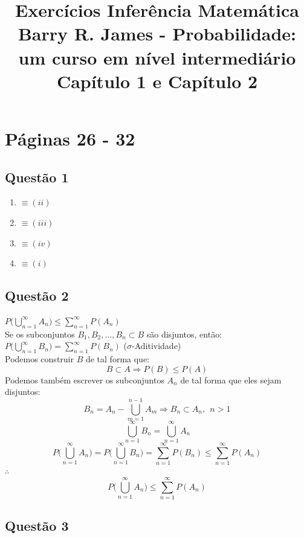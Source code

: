 \documentclass[a4paper,12pt]{report}
\author{}
\title{Exercícios Inferência Matemática\\
Barry R. James - Probabilidade: um curso em nível intermediário\\
Capítulo 1 e Capítulo 2
}
\date{}
\begin{document}
	\maketitle
	\tableofcontents	
	\newpage
	
	
	\chapter{Páginas 26 - 32}
	\section{Questão 1}
	\begin{enumerate}[label=(\alph*)]
		\item  $\equiv (ii)$
		\item $\equiv (iii)$
		\item $\equiv (iv)$
		\item $\equiv (i)$
	\end{enumerate}


       \section{Questão 2}


$P\bigg(\bigcup\limits_{n=1}^{\infty}A_n \bigg) \le \sum\limits_{n=1}^{\infty}P(A_n)$\\
Se os subconjuntos $B_1,B_2,\ldots,B_n\subset B $ são disjuntos, então:\\
$P\bigg(\bigcup\limits_{n=1}^{\infty}B_n \bigg) = \sum\limits_{n=1}^{\infty}P(B_n) $ ($\sigma$-Aditividade)\\
Podemos construir $B$ de tal forma que:
$$B\subset A \Rightarrow P(B)\le  P(A)$$
Podemos também escrever os subconjuntos $A_n$ de tal forma que eles sejam disjuntos:
$$B_n = A_n - \bigcup\limits_{m=1}^{n-1}A_m\Rightarrow B_n\subset A_n, \ \ n>1 $$
$$\bigcup\limits_{n=1}^{\infty}B_n=\bigcup\limits_{n=1}^{\infty}A_n $$
$$ P\bigg(\bigcup\limits_{n=1}^{\infty}A_n\bigg) =P\bigg(\bigcup\limits_{n=1}^{\infty}B_n\bigg) = \sum\limits_{n=1}^{\infty} P(B_n)
\le \sum\limits_{n=1}^{\infty}P(A_n)
$$
$\therefore  $
$$P\bigg(\bigcup\limits_{n=1}^{\infty}A_n \bigg) \le \sum\limits_{n=1}^{\infty}P(A_n)$$
\newpage
\section{Questão 3}
\end{document}
